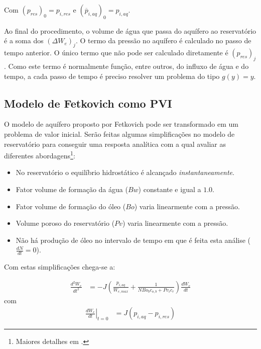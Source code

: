 \documentclass[final,5p]{elsarticle}
\numberwithin{equation}{section}
\begin{document}
        Com $(p_{res})_0 = p_{i,res}$ e $(\overline{p}_{i,aq})_0 = p_{i,aq}$.

        Ao final do procedimento, o volume de água que passa do aquífero ao reservatório é a soma dos $(\Delta W_e)_j$. O termo da pressão no aquífero é calculado no passo de tempo anterior. O único termo que não pode ser calculado diretamente é $(p_{res})_j$. Como este termo é normalmente função, entre outros, do influxo de água e do tempo, a cada passo de tempo é preciso resolver um problema do tipo $g(y) = y$.

    \subsection{Modelo de Fetkovich como PVI}

        O modelo de aquífero proposto por Fetkovich pode ser transformado em um problema de valor inicial. Serão feitas algumas simplificações no modelo de reservatório para conseguir uma resposta analítica com a qual avaliar as diferentes abordagens\footnote{Maiores detalhes em \cite{relatorioeuler}.}:

        \begin{itemize}
            \item No reservatório o equilíbrio hidrostático é alcançado \emph{instantaneamente}.
            \item Fator volume de formação da água ($Bw$) constante e igual a $1.0$.
            \item Fator volume de formação do óleo ($Bo$) varia linearmente com a pressão.
            \item Volume poroso do reservatório ($Pv$) varia linearmente com a pressão.
            \item Não há produção de óleo no intervalo de tempo em que é feita esta análise ($\frac{dN}{dt}=0$).
        \end{itemize}

        Com estas simplificações chega-se a:

        \begin{align}
            \frac{d^2W_e}{dt^2} &= - J \left(\frac{p_{i,aq}}{W_{e,max}} + \frac{1}{N Bo_b c_{o,b} + Pv_i c_r} \right)  \frac{dW_e}{dt} \label{eq:dwe2dt2res}
        \end{align}
        com
        \begin{align}
            \left.\frac{dW_e}{dt}\right|_{t=0} &= J (p_{i,aq} - p_{i,res}) \nonumber
        \end{align}
\end{document}
